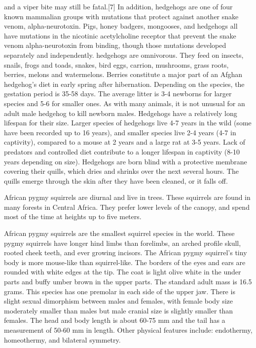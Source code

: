 \documentclass[twoside, 12pt, letterpaper]{report}\usepackage[]{graphicx}\usepackage[]{color}
\begin{document}
\begin{multicols*}{2}
and a viper bite may still be fatal.[7] In addition, hedgehogs are one of four known mammalian groups with mutations that protect against another snake venom, alpha-neurotoxin. Pigs, honey badgers, mongooses, and hedgehogs all have mutations in the nicotinic acetylcholine receptor that prevent the snake venom alpha-neurotoxin from binding, though those mutations developed separately and independently. hedgehogs are omnivorous. They feed on insects, snails, frogs and toads, snakes, bird eggs, carrion, mushrooms, grass roots, berries, melons and watermelons. Berries constitute a major part of an Afghan hedgehog's diet in early spring after hibernation. Depending on the species, the gestation period is 35-58 days. The average litter is 3-4 newborns for larger species and 5-6 for smaller ones. As with many animals, it is not unusual for an adult male hedgehog to kill newborn males. Hedgehogs have a relatively long lifespan for their size. Larger species of hedgehogs live 4-7 years in the wild (some have been recorded up to 16 years), and smaller species live 2-4 years (4-7 in captivity), compared to a mouse at 2 years and a large rat at 3-5 years. Lack of predators and controlled diet contribute to a longer lifespan in captivity (8-10 years depending on size). Hedgehogs are born blind with a protective membrane covering their quills, which dries and shrinks over the next several hours. The quills emerge through the skin after they have been cleaned, or it falls off.

\nsubsection{\squirrel}

African pygmy squirrels are diurnal and live in trees. These squirrels are found in many forests in Central Africa. They prefer lower levels of the canopy, and spend most of the time at heights up to five meters.

African pygmy squirrels are the smallest squirrel species in the world. These pygmy squirrels have longer hind limbs than forelimbs, an arched profile skull, rooted cheek teeth, and ever growing incisors. The African pygmy squirrel's tiny body is more mouse-like than squirrel-like. The borders of the eyes and ears are rounded with white edges at the tip. The coat is light olive white in the under parts and buffy umber brown in the upper parts. The standard adult mass is 16.5 grams. This species has one premolar in each side of the upper jaw. There is slight sexual dimorphism between males and females, with female body size moderately smaller than males but male cranial size is slightly smaller than females. The head and body length is about 60-75 mm and the tail has a measurement of 50-60 mm in length. Other physical features include: endothermy, homeothermy, and bilateral symmetry.


\end{multicols*}
\end{document}
